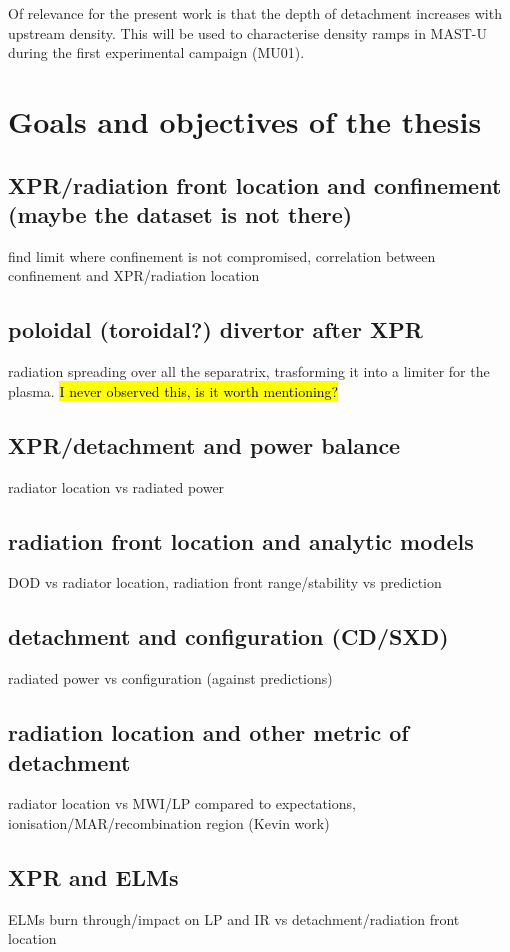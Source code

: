 Of relevance for the present work is that the depth of detachment increases with upstream density. This will be used to characterise density ramps in MAST-U during the first experimental campaign (MU01).







\section{Goals and objectives of the thesis}

\subsection{XPR/radiation front location and confinement (maybe the dataset is not there)}
find limit where confinement is not compromised, correlation between confinement and XPR/radiation location
\subsection{poloidal (toroidal?) divertor after XPR}
radiation spreading over all the separatrix, trasforming it into a limiter for the plasma.
\hl{I never observed this, is it worth mentioning?}
\subsection{XPR/detachment and power balance}
radiator location vs radiated power
\subsection{radiation front location and analytic models}
DOD vs radiator location, radiation front range/stability vs prediction
\subsection{detachment and configuration (CD/SXD)}
radiated power vs configuration (against predictions)
\subsection{radiation location and other metric of detachment}
radiator location vs MWI/LP compared to expectations, ionisation/MAR/recombination region (Kevin work)
\subsection{XPR and ELMs}
ELMs burn through/impact on LP and IR vs detachment/radiation front location
